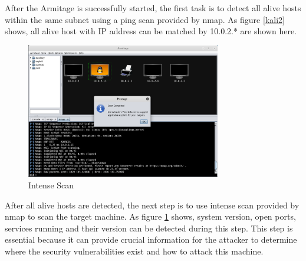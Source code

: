 \documentclass{article}
\begin{document}
After the Armitage is successfully started, the first task is to detect all alive hosts within the 
same subnet using a ping scan provided by nmap. As figure \ref{kali2} shows, all alive host with IP address 
can be matched by 10.0.2.* are shown here.

\begin{figure}[H]
  \includegraphics[width=8.5cm]{kali3}
  \caption{Intense Scan}
  \label{kali3}
\end{figure}

After all alive hosts are detected, the next step is to use intense scan provided by nmap to scan the 
target machine. As figure \ref{kali3} shows, system version, open ports, services running and their version 
can be detected during this step. This step is essential because it can provide crucial information 
for the attacker to determine where the security vulnerabilities exist and how to attack this machine.
\end{document}
